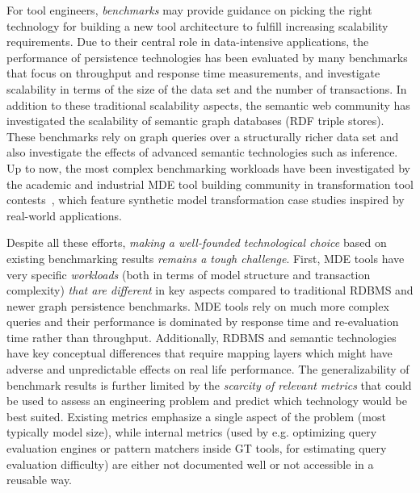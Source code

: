 For tool engineers, \emph{benchmarks} may provide guidance on picking the right technology for building a new tool architecture to fulfill increasing scalability requirements. Due to their central role in data-intensive applications, the performance of persistence technologies has been evaluated by many benchmarks~\cite{BSBM,SP2Bench} %
that focus on throughput and response time measurements, and investigate scalability in terms of the size of the data set and the number of transactions. In addition to these traditional scalability aspects, the semantic web community has investigated the scalability of semantic graph databases (RDF triple stores). These benchmarks rely on graph queries over a structurally richer data set and also investigate the effects of advanced semantic technologies such as inference. Up to now, the most complex benchmarking workloads have been investigated by the academic and industrial MDE tool building community in transformation tool contests~\cite{TTC}, which feature synthetic model transformation case studies inspired by real-world applications.

Despite all these efforts, \emph{making a well-founded technological choice} based on existing benchmarking results \emph{remains a tough challenge}. First, MDE tools have very specific \emph{workloads} (both in terms of model structure and transaction complexity) \emph{that are different} in key aspects compared to traditional RDBMS and newer graph persistence benchmarks. MDE tools rely on much more complex queries and their performance is dominated by response time and re-evaluation time rather than throughput. Additionally, RDBMS and semantic technologies have key conceptual differences that require mapping layers which might have adverse and unpredictable effects on real life performance.
The generalizability of benchmark results is further limited by the \emph{scarcity of relevant metrics} that could be used to assess an engineering problem and predict which technology would be best suited. Existing metrics emphasize a single aspect of the problem (most typically model size), while internal metrics (used by e.g. optimizing query evaluation engines or pattern matchers inside GT tools, for estimating query evaluation difficulty) are either not documented well or not accessible in a reusable way.



